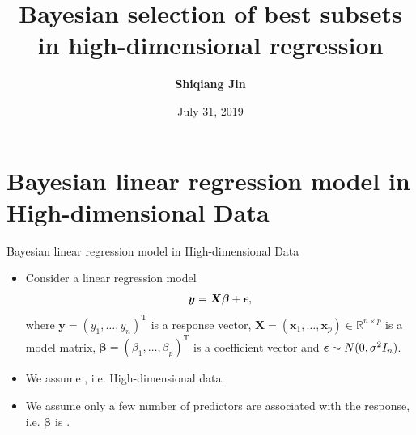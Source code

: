 \documentclass[citecolor=blue,10pt]{beamer}
\def\T{{ \mathrm{\scriptscriptstyle T} }}
\newcommand{\0} {\mbox{\boldmath$0$}}
\newcommand{\uy}{{\boldsymbol y}}
\newcommand{\ux}{{\boldsymbol x}}
\newcommand{\uX}{{\boldsymbol X}}
\newcommand{\ubeta}{{\boldsymbol \beta}}
\newcommand{\uepsilon} {\mbox{\boldmath $\epsilon$}}
\begin{document}
\title{Bayesian selection of best subsets in high-dimensional regression}
\author{\bf Shiqiang Jin}


\date{July 31, 2019}

\begin{frame}
\titlepage
\end{frame}


\section{Bayesian linear regression model in High-dimensional Data}
\begin{frame}{Bayesian linear regression model in High-dimensional Data}
\begin{itemize}\itemsep=5mm
\item Consider a linear regression model
\begin{eqnarray} \label{eq:1}
\uy=\uX\ubeta +\uepsilon,
\end{eqnarray}
where $\uy=(y_1,\ldots,y_n)^{\T}$ is a response vector, $\uX=(\ux_1,\ldots,\ux_p)\in\mathbb{R}^{n\times p}$ is a model matrix, $\ubeta=(\beta_1,\ldots, \beta_p)^\T$ is a coefficient vector and $\uepsilon \sim N(0,\sigma^2 I_n)$.
 \item We assume {\color{red}{$p>n$}}, i.e. High-dimensional data. 
 \item We assume only a few number of predictors are associated with the response, i.e. $\ubeta$ is {\color{red}{sparse}}.
 \end{itemize}
\end{frame}
\end{document}
